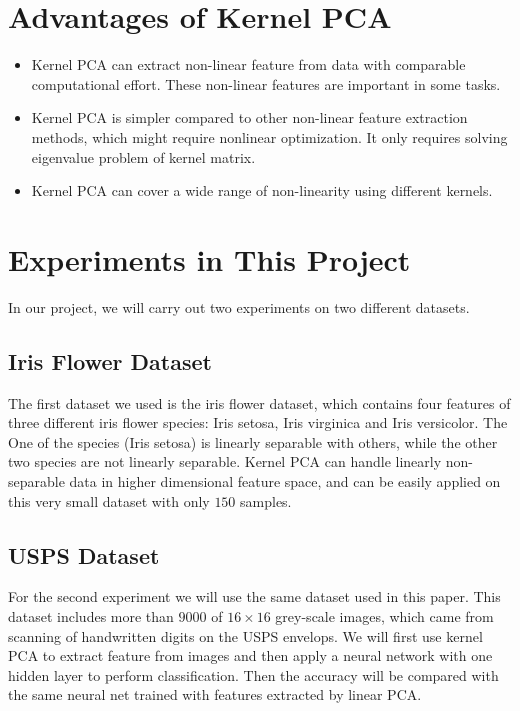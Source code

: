 \section{Advantages of Kernel PCA}

\begin{itemize}
  \item Kernel PCA can extract non-linear feature from data with comparable computational effort. These non-linear features are important in some tasks.
  \item Kernel PCA is simpler compared to other non-linear feature extraction methods, which might require nonlinear optimization. It only requires solving eigenvalue problem of kernel matrix.
  \item Kernel PCA can cover a wide range of non-linearity using different kernels.
\end{itemize}


\section{Experiments in This Project}

In our project, we will carry out two experiments on two different datasets.

\subsection{Iris Flower Dataset}
The first dataset we used is the iris flower dataset, which contains four features of three different iris flower species: Iris setosa, Iris virginica and Iris versicolor. The One of the species (Iris setosa) is linearly separable with others, while the other two species are not linearly separable. Kernel PCA can handle linearly non-separable data in higher dimensional feature space, and can be easily applied on this very small dataset with only $150$ samples.

\subsection{USPS Dataset}
For the second experiment we will use the same dataset used in this paper. This dataset includes more than $9000$ of $16 \times 16$ grey-scale images, which came from scanning of handwritten digits on the USPS envelops. We will first use kernel PCA to extract feature from images and then apply a neural network with one hidden layer to perform classification. Then the accuracy will be compared with the same neural net trained with features extracted by linear PCA.
\clearpage

%
%
%



